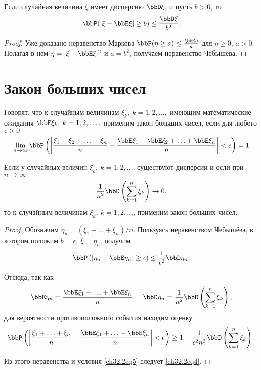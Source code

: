 \begin{thm}
Если случайная величина $\xi$ имеет дисперсию $\bbD \xi$, и пусть $b>0$, то
$$
\bbP(|\xi-\bbE \xi|\ge b ) \le\frac{\bbD \xi}{b^2}.
$$
\end{thm} 
\begin{proof}
Уже доказано неравенство Маркова $\bbP(\eta \ge a) \le \frac{\bbE\eta}{a}$  для $\eta \ge 0$, $a>0$. Полагая в нем $\eta = |\xi-\bbE \xi|^2$ и $a=b^2$, получаем неравенство Чебышёва.
\end{proof}

\section{Закон больших чисел}

Говорят, что к случайным величинам $\xi_k, \: k = 1, 2, \ldots,$ имеющим математические ожидания $\bbE\xi_k, \: k = 1, 2,\ldots,$ применим закон больших чисел, если для любого $\epsilon > 0$
\begin{equation} \label{ch32.2eq4}
\lim_{n \to \infty} \bbP \left( \left| \frac{\xi_1 + \xi_2 + \ldots + \xi_n}{n} - \frac{\bbE \xi_1 + \bbE \xi_2 + \ldots + \bbE \xi_n}{n} \right| < \epsilon \right) = 1
\end{equation}

\begin{thm} [Маркова]
Если у случайных величин $\xi_k, \: k = 1,2,\ldots$, существуют дисперсии и если при $n \to \infty$
\begin{equation} \label{ch32.2eq5}
\frac{1}{n^2} \bbD  \left( \sum_{k  = 1}^{n} \xi_k\right) \to 0,
\end{equation}
то к случайным величинам $\xi_k, \: k = 1,2,\ldots$, применим закон больших чисел.
\end{thm}

\begin{proof}
Обозначим $\eta_n = (\xi_1 + \ldots + \xi_n) / n$. Пользуясь неравенством Чебышёва, в котором положим $b = \epsilon, \: \xi = \eta_n$, получим
$$
\bbP \left( \left| \eta_n - \bbE  \eta_n \right| \ge \epsilon \right) \le \frac{1}{\epsilon^2} \bbD  \eta_n.
$$

Отсюда, так как
$$
\bbE  \eta_n = \frac{\bbE \xi_1 + \ldots + \bbE \xi_n}{n}, \quad \bbD \eta_n = \frac{1}{n^2} \bbD  \left( \sum_{k  = 1}^{n} \xi_k\right),
$$ 
для вероятности противоположного события находим оценку
$$
\bbP \left( \left| \frac{\xi_1 + \ldots + \xi_n}{n} - \frac{\bbE \xi_1 + \ldots + \bbE \xi_n}{n} \right| < \epsilon \right) \ge 1 - \frac{1}{\epsilon^2n^2} \bbD  \left( \sum_{k  = 1}^{n} \xi_k\right).
$$

Из этого неравенства и условия \eqref{ch32.2eq5} следует \eqref{ch32.2eq4}.
\end{proof}

